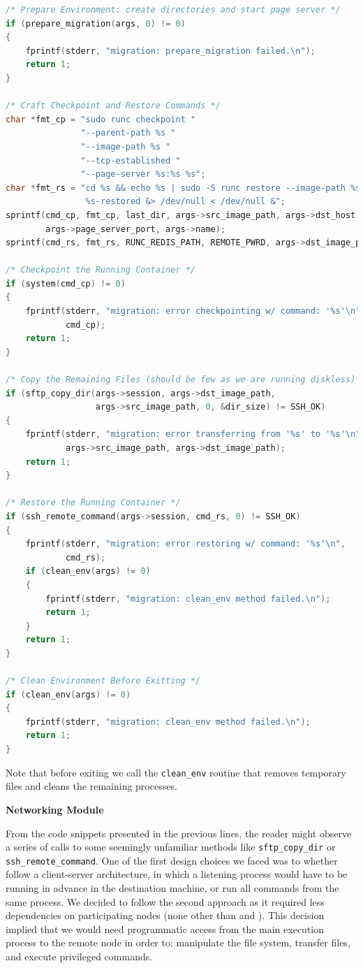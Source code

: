 \begin{lstlisting}[language=C,caption={Snippet for the last (stopping) checkpoint and remote restore.\label{code:last-cp}}]
/* Prepare Environment: create directories and start page server */
if (prepare_migration(args, 0) != 0)
{
    fprintf(stderr, "migration: prepare_migration failed.\n");
    return 1;
}

/* Craft Checkpoint and Restore Commands */
char *fmt_cp = "sudo runc checkpoint "
               "--parent-path %s "
               "--image-path %s "
               "--tcp-established "
               "--page-server %s:%s %s";
char *fmt_rs = "cd %s && echo %s | sudo -S runc restore --image-path %s \
                %s-restored &> /dev/null < /dev/null &";
sprintf(cmd_cp, fmt_cp, last_dir, args->src_image_path, args->dst_host,
        args->page_server_port, args->name);
sprintf(cmd_rs, fmt_rs, RUNC_REDIS_PATH, REMOTE_PWRD, args->dst_image_path, args->name);

/* Checkpoint the Running Container */
if (system(cmd_cp) != 0)
{
    fprintf(stderr, "migration: error checkpointing w/ command: '%s'\n",
            cmd_cp);
    return 1;
}

/* Copy the Remaining Files (should be few as we are running diskless) */
if (sftp_copy_dir(args->session, args->dst_image_path, 
                  args->src_image_path, 0, &dir_size) != SSH_OK)
{
    fprintf(stderr, "migration: error transferring from '%s' to '%s'\n",
            args->src_image_path, args->dst_image_path);
    return 1;
}

/* Restore the Running Container */
if (ssh_remote_command(args->session, cmd_rs, 0) != SSH_OK)
{
    fprintf(stderr, "migration: error restoring w/ command: '%s'\n",
            cmd_rs);
    if (clean_env(args) != 0)
    {
        fprintf(stderr, "migration: clean_env method failed.\n");
        return 1;
    }
    return 1;
}

/* Clean Environment Before Exitting */
if (clean_env(args) != 0)
{
    fprintf(stderr, "migration: clean_env method failed.\n");
    return 1;
}
\end{lstlisting}
Note that before exiting we call the \texttt{clean\_env} routine that removes temporary files and cleans the remaining processes.

\textbf{Networking Module}

From the code snippets presented in the previous lines, the reader might observe a series of calls to some seemingly unfamiliar methods like \texttt{sftp\_copy\_dir} or \texttt{ssh\_remote\_command}.
One of the first design choices we faced was to whether follow a client-server architecture, in which a listening process would have to be running in advance in the destination machine, or run all commands from the same process.
We decided to follow the second approach as it required less dependencies on participating nodes (none other than \criu and \runc).
This decision implied that we would need programmatic access from the main execution process to the remote node in order to: manipulate the file system, transfer files, and execute privileged commands.

